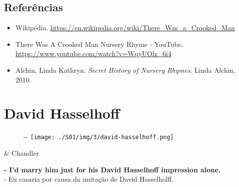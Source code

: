 \hypertarget{referuxeancias-2}{%
\subsection{Referências}\label{referuxeancias-2}}

\begin{itemize}
\tightlist
\item
  \sloppy Wikipédia. \url{https://en.wikipedia.org/wiki/There_Was_a_Crooked_Man}
\item
  \sloppy There Was A Crooked Man Nursery Rhyme - YouTube. \url{https://www.youtube.com/watch?v=WqyUOlz_6i4}
\item
  Alchin, Linda Kathryn. \emph{Secret History of Nursery Rhymes.} Linda
  Alchin, 2010.
\end{itemize}

\hypertarget{david-hasselhoff}{%
\section{David Hasselhoff}\label{david-hasselhoff}}

\begin{figure}[!ht]
  \begin{adjustwidth}{-\oddsidemargin-1in}{-\rightmargin}
    \centering
    \texttt{[image: ./S01/img/3/david-hasselhoff.png]}
  \end{adjustwidth}
\end{figure}

\begin{tcolorbox}[enhanced,center upper,
    drop fuzzy shadow southeast, boxrule=0.3pt,
    lower separated=false,
    colframe=black!30!dialogoBorder,colback=white]
\begin{minipage}[c]{0.16\linewidth}
   & \centering \scriptsize{Chandler}
\end{minipage}
\hfill
\begin{minipage}[c]{0.8\linewidth}
  \textbf{- I'd marry him just for his David Hasselhoff impression alone.}\\
  - Eu casaria por causa da imitação de David Hasselholff.
\end{minipage}
\end{tcolorbox}

